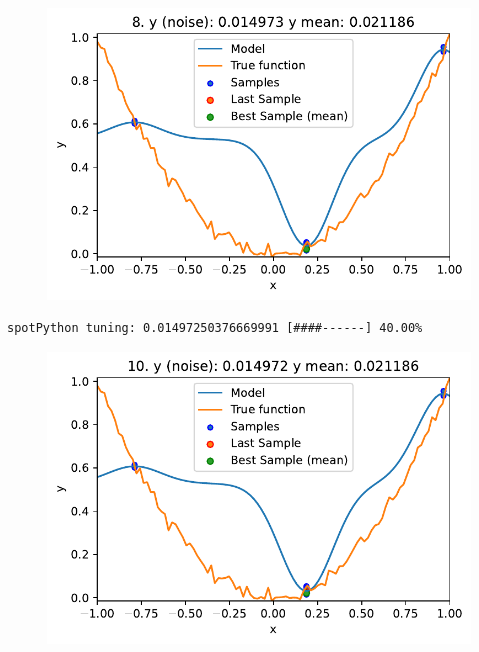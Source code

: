 \documentclass[
  letterpaper,
  DIV=11,
  numbers=noendperiod]{scrreprt}
\begin{document}
\begin{figure}[H]

{\centering \includegraphics{08_spot_noisy_files/figure-pdf/cell-6-output-2.pdf}

}

\end{figure}

\begin{verbatim}
spotPython tuning: 0.01497250376669991 [####------] 40.00% 
\end{verbatim}

\begin{figure}[H]

{\centering \includegraphics{08_spot_noisy_files/figure-pdf/cell-6-output-4.pdf}

}

\end{figure}
\end{document}
